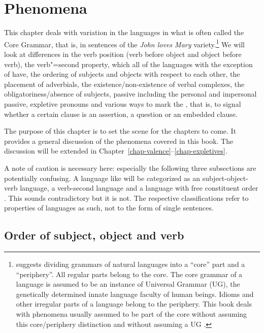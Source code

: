 
\settowidth{}


\chapter{Phenomena}

This chapter deals with variation in the  languages in what is often called the Core
Grammar, that is, in sentences of the \emph{John loves Mary} variety.\footnote{%
  \citet[--8]{Chomsky81a} suggests dividing grammars of natural languages into a ``core'' part and a ``periphery''.
All regular parts belong to the core. The core grammar of a language is assumed to be an instance of
Universal Grammar (UG), the genetically determined innate language faculty of human beings. Idioms
and other irregular parts of a language belong to the periphery. This book deals with phenomena
usually assumed to be part of the core without assuming this core/periphery distinction and without assuming
a UG \citep{MuellerKernigkeit,MuellerCoreGram}.
} We will look at differences in
the verb position (verb before object and object before verb), the verb"=second property, which
all of the  languages with the exception of  have, the ordering of subjects and
objects with respect to each other, the placement of adverbials, the existence/non-existence of
verbal complexes, the obligatoriness/absence of subjects, passive including the personal and
impersonal passive, expletive pronouns and various ways to mark the , that is, to
signal whether a certain clause is an assertion, a question or an embedded clause.

The purpose of this chapter is to set the scene for the chapters to come. It provides a general
discussion of the phenomena covered in this book. The discussion will be extended in Chapter~\ref{chap-valence}--\ref{chap-expletives}.

A note of caution is necessary here: especially the following three subsections are potentially
confusing. A language like  will be categorized as an subject-object-verb language, a verb-second language and
a language with free constituent order \citep{Haftka96a}. This sounds contradictory but it is not. The respective
classifications refer to properties of languages as such, not to the form of single sentences.

\section{Order of subject, object and verb}
\label{sec-intro-svo}

